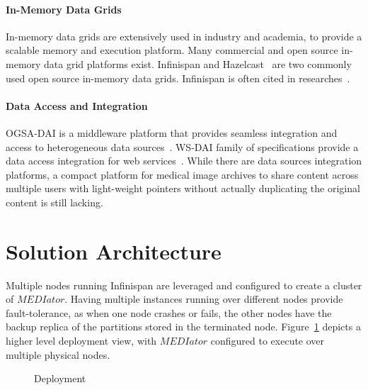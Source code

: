 \documentclass[conference]{IEEEtran}
\begin{document}
\paragraph*{\textbf{In-Memory Data Grids}}
In-memory data grids are extensively used in industry and academia, to provide a scalable memory and execution platform. Many commercial and open source in-memory data grid platforms exist. Infinispan and Hazelcast~\cite{hazelcast} are two commonly used open source in-memory data grids. Infinispan is often cited in researches~\cite{palmieri2012integrated,rosa2011goal,ruivo2011exploiting}.

\paragraph*{\textbf{Data Access and Integration}}
OGSA-DAI is a middleware platform that provides seamless integration and access to heterogeneous data sources~\cite{antonioletti2005design}. WS-DAI family of specifications provide a data access integration for web services~\cite{antonioletti2006ws}. While there are data sources integration platforms, a compact platform for medical image archives to share content across multiple users with light-weight pointers without actually duplicating the original content is still lacking.


\section{Solution Architecture}

Multiple nodes running Infinispan are leveraged and configured to create a cluster of $MEDIator$. Having multiple instances running over different nodes provide fault-tolerance, as when one node crashes or fails, the other nodes have the backup replica of the partitions stored in the terminated node. Figure~\ref{fig:deployment} depicts a higher level deployment view, with $MEDIator$ configured to execute over multiple physical nodes.
\begin{figure}[!h]
\begin{center}
  \vspace{-15pt}
\end{center}
 \caption{Deployment}
 \label{fig:deployment}
 \vspace{-18pt}
\end{figure}
\end{document}
